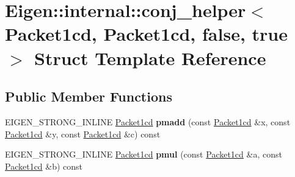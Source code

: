 \hypertarget{struct_eigen_1_1internal_1_1conj__helper_3_01_packet1cd_00_01_packet1cd_00_01false_00_01true_01_4}{}\section{Eigen\+::internal\+::conj\+\_\+helper$<$ Packet1cd, Packet1cd, false, true $>$ Struct Template Reference}
\label{struct_eigen_1_1internal_1_1conj__helper_3_01_packet1cd_00_01_packet1cd_00_01false_00_01true_01_4}
\subsection*{Public Member Functions}
\begin{DoxyCompactItemize}
\item 
\mbox{\label{struct_eigen_1_1internal_1_1conj__helper_3_01_packet1cd_00_01_packet1cd_00_01false_00_01true_01_4_a239ba231d08da7038b01908334bef352}} 
E\+I\+G\+E\+N\+\_\+\+S\+T\+R\+O\+N\+G\+\_\+\+I\+N\+L\+I\+NE \mbox{\hyperlink{struct_eigen_1_1internal_1_1_packet1cd}{Packet1cd}} {\bfseries pmadd} (const \mbox{\hyperlink{struct_eigen_1_1internal_1_1_packet1cd}{Packet1cd}} \&x, const \mbox{\hyperlink{struct_eigen_1_1internal_1_1_packet1cd}{Packet1cd}} \&y, const \mbox{\hyperlink{struct_eigen_1_1internal_1_1_packet1cd}{Packet1cd}} \&c) const
\item 
\mbox{\label{struct_eigen_1_1internal_1_1conj__helper_3_01_packet1cd_00_01_packet1cd_00_01false_00_01true_01_4_a077ec7bf6ea716ab78494320e7a6e085}} 
E\+I\+G\+E\+N\+\_\+\+S\+T\+R\+O\+N\+G\+\_\+\+I\+N\+L\+I\+NE \mbox{\hyperlink{struct_eigen_1_1internal_1_1_packet1cd}{Packet1cd}} {\bfseries pmul} (const \mbox{\hyperlink{struct_eigen_1_1internal_1_1_packet1cd}{Packet1cd}} \&a, const \mbox{\hyperlink{struct_eigen_1_1internal_1_1_packet1cd}{Packet1cd}} \&b) const
\item 
\mbox{\label{struct_eigen_1_1internal_1_1conj__helper_3_01_packet1cd_00_01_packet1cd_00_01false_00_01true_01_4_a239ba231d08da7038b01908334bef352}} 

\end{DoxyCompactItemize}
